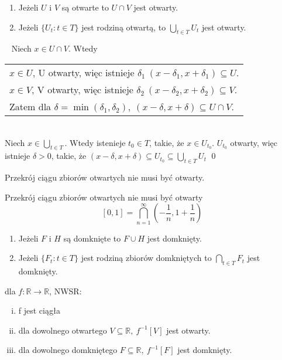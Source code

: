 \begin{tw} 
    \hfill
    \begin{enumerate}[{(}1{)}]
        \item Jeżeli $U$ i $V$ są otwarte to $U \cap V $ jest otwarty. 
        \item Jeżeli $\{U_t : t \in T\}$ jest rodziną otwartą, to $ \bigcup\limits_{t \in T} U_t $ jest otwarty.
    \end{enumerate}
\end{tw} 
\begin{dd} 
    ~\newline
    Niech $x \in U \cap V$. Wtedy 
    \begin{tabular}[t]{l} 
    $x \in U $, U otwarty, więc istnieje $\delta_1 \ (x-\delta_1,x+\delta_1) \subseteq U$.\\
    $x \in V$, V otwarty, więc istnieje $\delta_2 \ (x-\delta_2,x+\delta_2) \subseteq V.$ \\ 
    Zatem dla $\delta = \min(\delta_1,\delta_2), \ (x-\delta,x+\delta) \subseteq U \cap V$.
    \end{tabular} \\[5mm]
    Niech $x \in \bigcup\limits_{t \in T} $. Wtedy istenieje $t_0 \in T$,
    takie, że $x \in U_{t_0}$. $U_{t_0}$ otwarty, więc istnieje $\delta > 0$,
    takie, że $( x - \delta, x+\delta) \subseteq U_{t_0} \subseteq \bigcup\limits_{t \in T} U_t $
    \qed
\end{dd}
\begin{uw}
    Przekrój ciągu zbiorów otwartych nie musi być otwarty.
\end{uw}
\begin{prz}
    Przekrój ciągu zbiorów otwartych nie musi być otwarty
    \[ [0,1] = \bigcap_{n=1}^\infty (-\frac{1}{n},1+\frac{1}{n}) \]
\end{prz}
\begin{uw} 
    \hfill
    \begin{enumerate}[(1)]
        \item Jeżeli $F$ i $H$ są domknięte to $F \cup H$ jest domknięty. 
        \item Jeżeli $\{ F_t : t \in T \}$ jest rodziną zbiorów domkniętych to $\bigcap\limits_{t \in T} F_t$ jest domknięty.
    \end{enumerate}
\end{uw}

\begin{tw}
    dla $f: \mathbb{R} \rightarrow \mathbb{R}$, NWSR: 
    \begin{enumerate}[(i)]
        \item f jest ciągła 
        \item dla dowolnego otwartego $V \subseteq \mathbb{R}, \  f^{-1}[V]$ jest otwarty.  
        \item dla dowolnego domkniętego $ F \subseteq \mathbb{R}, \ f^{-1}[F]$ jest domknięty. 
    \end{enumerate}
\end{tw}

